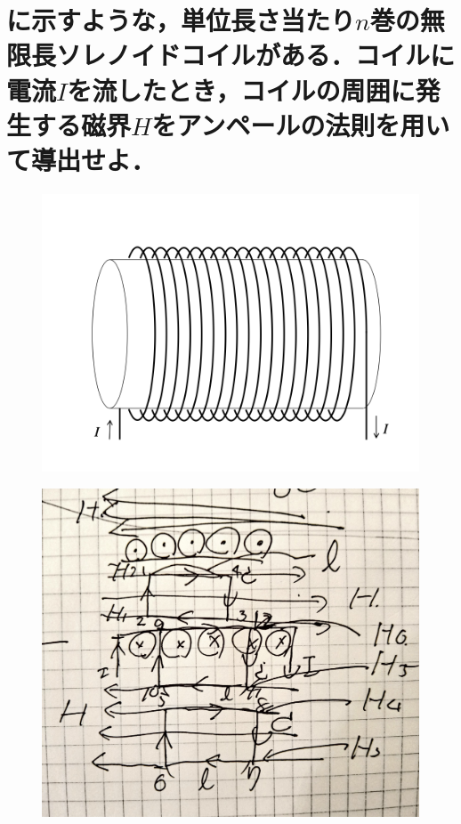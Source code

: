 \documentclass[dvipdfmx]{ujarticle}
\begin{document}
\section{に示すような，単位長さ当たり$n$巻の無限長ソレノイドコイルがある．コイルに電流$I$を流したとき，コイルの周囲に発生する磁界$H$をアンペールの法則を用いて導出せよ．}

\begin{figure}[h]
	\centering
	\includegraphics[scale=0.35]{./fig/R03_fig2.png}
	\caption{}
	\label{fig:2}
\end{figure}

\begin{figure}[h]
	\centering
	\includegraphics[scale=0.35]{./fig/fig.pdf}
	\caption{}
	\label{fig:a}
\end{figure}
\end{document}

